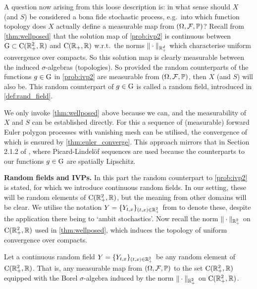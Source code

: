 \vspace*{2mm}
A question now arising from this loose description is: in what sense should $X$ (and $S$) be considered a bona fide stochastic process, e.g.~into which function topology does $X$ actually define a measurable map from $(\Omega,\mathcal{F},\mathbb{P})$? Recall from \autoref{thm:wellposed} that the solution map of \autoref{prob:ivp2} is continuous between $\mathrm{G}\subset\mathrm{C}(\mathbb{R}_+^2,\mathbb{R})$ and $\mathrm{C}(\mathbb{R}_+,\mathbb{R})$ w.r.t.~the norms $\Vert\cdot\Vert_{\mathbb{R}_+^d}$ which characterise uniform convergence over compacts. So this solution map is clearly measurable between the induced $\sigma$-algebras (topologies). So provided the random counterparts of the functions $g\in\mathrm{G}$ in \autoref{prob:ivp2} are measurable from $(\Omega,\mathcal{F},\mathbb{P})$, then $X$ (and $S$) will also be. This random counterpart of $g\in\mathrm{G}$ is called a random field, introduced in \autoref{def:rand_field}.

We only invoke \autoref{thm:wellposed} above because we can, and the measurability of $X$ and $S$ can be established directly. For this a sequence of (measurable) forward Euler polygon processes with vanishing mesh can be utilised, the convergence of which is ensured by \autoref{thm:euler_converge}. This approach mirrors that in Section 2.1.2 of \cite{han_2017}, where Picard-Lindel\"of sequences are used because the counterparts to our functions $g\in\mathrm{G}$ are spatially Lipschitz.

\vspace{3mm}\textbf{Random fields and IVPs.} In this part the random counterpart to \autoref{prob:ivp2} is stated, for which we introduce continuous random fields. In our setting, these will be random elements of $\mathrm{C}(\mathbb{R}_+^2,\mathbb{R})$, but the meaning from other domains will be clear. We utilise the notation $Y=\{Y_{t,x}\}_{(t,x)\in\mathbb{R}_+^2}$ from \cite{barndorff-nielsen_2018} to denote these, despite the application there being to `ambit stochastics'. Now recall the norm $\Vert\cdot\Vert_{\mathbb{R}_+^2}$ on $\mathrm{C}(\mathbb{R}_+^2,\mathbb{R})$ used in \autoref{thm:wellposed}, which induces the topology of uniform convergence over compacts.

\begin{definition}\label{def:rand_field}
    Let a continuous random field $Y=\{Y_{t,x}\}_{(t,x)\in\mathbb{R}_+^2}$ be any random element of $\mathrm{C}(\mathbb{R}_+^2,\mathbb{R})$. That is, any measurable map from $(\Omega,\mathcal{F},\mathbb{P})$ to the set $\mathrm{C}(\mathbb{R}_+^2,\mathbb{R})$ equipped with the Borel $\sigma$-algebra induced by the norm $\Vert\cdot\Vert_{\mathbb{R}_+^2}$ on $\mathrm{C}(\mathbb{R}_+^2,\mathbb{R})$.
\end{definition}

